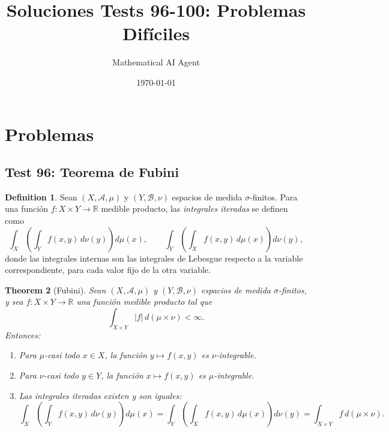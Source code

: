 \documentclass[11pt,a4paper]{article}
\title{Soluciones Tests 96-100: Problemas Difíciles}
\author{Mathematical AI Agent}
\date{\today}
\theoremstyle{plain}
\newtheorem{theorem}{Theorem}[section]
\theoremstyle{definition}
\newtheorem{definition}[theorem]{Definition}
\begin{document}
\maketitle

\section{Problemas}

\subsection*{Test 96: Teorema de Fubini}

\begin{definition}
Sean $(X,\mathcal{A},\mu)$ y $(Y,\mathcal{B},\nu)$ espacios de medida $\sigma$-finitos. Para una función $f:X\times Y\to\mathbb{R}$ medible producto, las \emph{integrales iteradas} se definen como
\[
\int_{X}\!\left(\int_{Y}f(x,y)\,d\nu(y)\right)d\mu(x),\qquad
\int_{Y}\!\left(\int_{X}f(x,y)\,d\mu(x)\right)d\nu(y),
\]
donde las integrales internas son las integrales de Lebesgue respecto a la variable correspondiente, para cada valor fijo de la otra variable.
\end{definition}

\begin{theorem}[Fubini]
Sean $(X,\mathcal{A},\mu)$ y $(Y,\mathcal{B},\nu)$ espacios de medida $\sigma$-finitos, y sea $f:X\times Y\to\mathbb{R}$ una función medible producto tal que
\[
\int_{X\times Y}|f|\,d(\mu\times\nu)<\infty.
\]
Entonces:
\begin{enumerate}
\item Para $\mu$-casi todo $x\in X$, la función $y\mapsto f(x,y)$ es $\nu$-integrable.
\item Para $\nu$-casi todo $y\in Y$, la función $x\mapsto f(x,y)$ es $\mu$-integrable.
\item Las integrales iteradas existen y son iguales:
\[
\int_{X}\!\left(\int_{Y}f(x,y)\,d\nu(y)\right)d\mu(x)
=\int_{Y}\!\left(\int_{X}f(x,y)\,d\mu(x)\right)d\nu(y)
=\int_{X\times Y}f\,d(\mu\times\nu).
\]
\end{enumerate}
\end{theorem}
\end{document}
